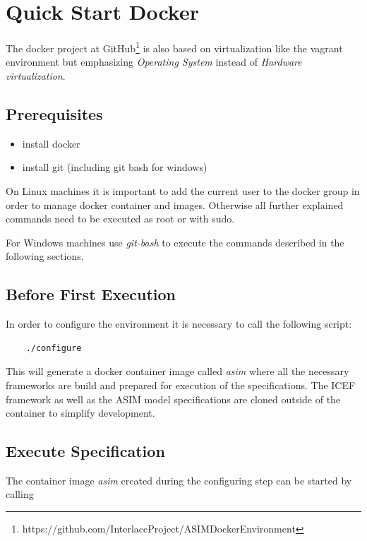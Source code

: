 \section{Quick Start Docker}
\label{sec:quick-start-docker}

The docker project at GitHub\footnote{https://github.com/InterlaceProject/ASIMDockerEnvironment} is also based on virtualization like the vagrant environment but emphasizing \textit{Operating System} instead of \textit{Hardware virtualization}\cite{VirtualMachines2005}.

\subsection{Prerequisites}

\begin{itemize}
	\item install docker
	\item install git (including git bash for windows)
\end{itemize}

On Linux machines it is important to add the current user to the docker group in order to manage docker container and images. Otherwise all further explained commands need to be executed as root or with sudo.

For Windows machines use \textit{git-bash} to execute the commands described in the following sections.

\subsection{Before First Execution}

In order to configure the environment it is necessary to call the following script:

\begin{lstlisting}
	./configure
\end{lstlisting}

This will generate a docker container image called \textit{asim} where all the necessary frameworks are build and prepared for execution of the specifications. The ICEF framework as well as the ASIM model specifications are cloned outside of the container to simplify development.

\subsection{Execute Specification}

The container image \textit{asim} created during the configuring step can be started by calling

